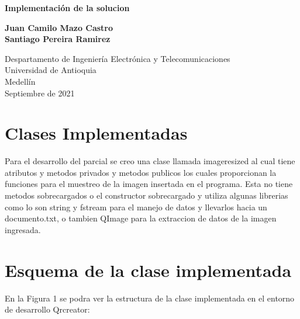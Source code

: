 \documentclass{article}
\begin{document}
\begin{titlepage}
    \begin{center}
        \vspace*{1cm}
            
        \Huge
        \textbf{Implementación de la solucion}
            
        \vspace{0.5cm}
        \LARGE
        
            
        \vspace{1.5cm}
            
        \textbf{Juan Camilo Mazo Castro}\\
        \textbf{Santiago Pereira Ramirez}
            
        \vfill
            
        \vspace{0.8cm}
            
        \Large
        Despartamento de Ingeniería Electrónica y Telecomunicaciones\\
        Universidad de Antioquia\\
        Medellín\\
        Septiembre de 2021
            
    \end{center}
\end{titlepage}

\tableofcontents
\newpage
\section{Clases Implementadas}\label{intro}
Para el desarrollo del parcial se creo una clase llamada imageresized al cual tiene atributos y metodos privados y metodos publicos los cuales proporcionan la funciones para el muestreo de la imagen insertada en el programa. Esta no tiene metodos sobrecargados o el constructor sobrecargado y utiliza algunas librerias como lo son string y fstream para el manejo de datos y llevarlos hacia un documento.txt, o tambien QImage para la extraccion de datos de la imagen ingresada.


\section{Esquema de la clase implementada }\label{contenido}

En la Figura 1 se podra ver la estructura de la clase implementada en el entorno de desarrollo Qrcreator:
\end{document}
